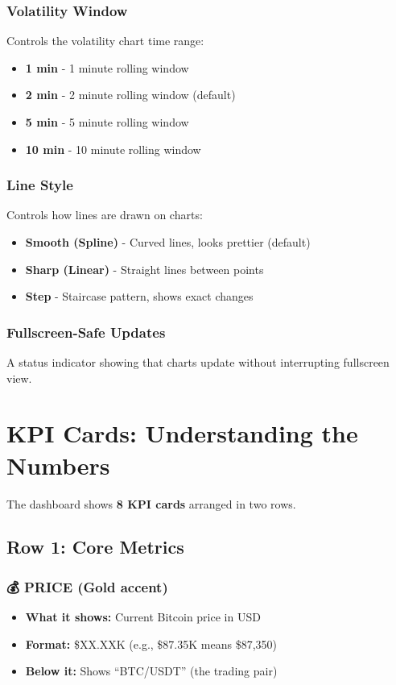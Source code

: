 \documentclass[12pt,a4paper]{article}
\begin{document}
\subsubsection{Volatility Window}
Controls the volatility chart time range:
\begin{itemize}
    \item \textbf{1 min} - 1 minute rolling window
    \item \textbf{2 min} - 2 minute rolling window (default)
    \item \textbf{5 min} - 5 minute rolling window
    \item \textbf{10 min} - 10 minute rolling window
\end{itemize}

\subsubsection{Line Style}
Controls how lines are drawn on charts:
\begin{itemize}
    \item \textbf{Smooth (Spline)} - Curved lines, looks prettier (default)
    \item \textbf{Sharp (Linear)} - Straight lines between points
    \item \textbf{Step} - Staircase pattern, shows exact changes
\end{itemize}

\subsubsection{Fullscreen-Safe Updates}
A status indicator showing that charts update without interrupting fullscreen view.

\section{KPI Cards: Understanding the Numbers}

The dashboard shows \textbf{8 KPI cards} arranged in two rows.

\subsection{Row 1: Core Metrics}

\subsubsection{💰 PRICE (Gold accent)}
\begin{itemize}
    \item \textbf{What it shows:} Current Bitcoin price in USD
    \item \textbf{Format:} \$XX.XXK (e.g., \$87.35K means \$87,350)
    \item \textbf{Below it:} Shows ``BTC/USDT'' (the trading pair)
\end{itemize}
\end{document}
